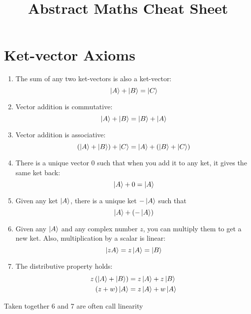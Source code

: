 \documentclass[12pt,a4paper,twocolumn]{article}
\title{Abstract Maths Cheat Sheet}
\date{}
\author{}
\begin{document}
\maketitle

\section{Ket-vector Axioms}
\begin{enumerate}
    \item The sum of any two ket-vectors is also a ket-vector:
    \begin{equation}
        \ket{A}  + \ket{B} = \ket{C}
    \end{equation}
    \item Vector addition is commutative:
    \begin{equation}
        \ket{ A } +\ket{ B } =\ket{B} +\ket{A}
    \end{equation}
    \item Vector addition is associative:
    \begin{equation}
        \left(\ket{ A } +\ket{ B }\right)+\ket{ C } =\ket{ A } +  \left(\ket{B }+\ket{ C }\right)
    \end{equation}
    \item There is a unique vector $0$ such that when you add it to any ket, it gives the same ket back:
    \begin{equation}
       \ket{ A } + 0 =\ket{ A }
    \end{equation}
    \item Given any ket $\ket{A}$, there is a unique ket $-\ket{A}$ such that
    \begin{equation}
       \ket{A} + \left( -\ket{A} \right)
    \end{equation}
    \item Given any $\ket{A}$ and any complex number $z$, you can multiply them to get a new ket. Also, multiplication by a scalar is linear:
    \begin{equation}
       \ket{zA} = z\ket{ A } =\ket{B}
    \end{equation}
    \item The distributive property holds:
    \begin{align}
        z\left(\ket{A} +\ket{B}\right) &=  z\ket{A} + z\ket{B}\\
        \left( z+w\right)\ket{A} &= z\ket{A} + w\ket{A}
    \end{align}
\end{enumerate}
Taken together 6 and 7 are often call linearity
\end{document}

